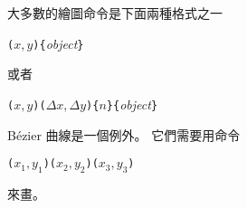 大多數的繪圖命令是下面兩種格式之一
\begin{lscommand}
\verb|(|$x,y$\verb|){|\emph{object}\verb|}|
\end{lscommand}
\noindent 或者
\begin{lscommand}
\verb|(|$x,y$\verb|)(|$\Delta x,\Delta
y$\verb|){|$n$\verb|}{|\emph{object}\verb|}|\end{lscommand}
B\'ezier 曲線是一個例外。 它們需要用命令
\begin{lscommand}
\verb|(|$x_1,y_1$\verb|)(|$x_2,y_2$\verb|)(|$x_3,y_3$\verb|)|
\end{lscommand}
\noindent 來畫。
\newpage

